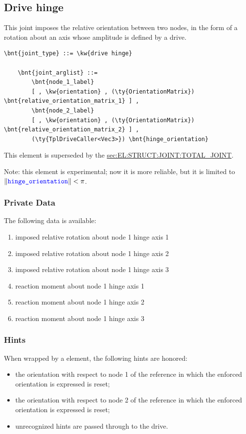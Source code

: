 \subsection{Drive hinge}
\label{sec:EL:JOINT:DRIVEHINGE}
This joint imposes the relative orientation between two nodes,
in the form of a rotation about an axis whose amplitude is defined
by a drive.
\begin{Verbatim}[commandchars=\\\{\}]
    \bnt{joint_type} ::= \kw{drive hinge}

    \bnt{joint_arglist} ::= 
        \bnt{node_1_label}
        [ , \kw{orientation} , (\ty{OrientationMatrix}) \bnt{relative_orientation_matrix_1} ] ,
        \bnt{node_2_label}
        [ , \kw{orientation} , (\ty{OrientationMatrix}) \bnt{relative_orientation_matrix_2} ] ,
        (\ty{TplDriveCaller<Vec3>}) \bnt{hinge_orientation}
\end{Verbatim}
This element is superseded by the
\hyperref{\kw{total joint}}{\kw{total joint}, see Section~}{}{sec:EL:STRUCT:JOINT:TOTAL_JOINT}.

Note: this element is experimental; now it is more reliable, 
but it is limited to $\left\| \textcolor{blue}{\texttt{hinge\_orientation}} \right\| < \pi$.

\subsubsection{Private Data}
The following data is available:
\begin{enumerate}
\item {} imposed relative rotation about node 1 hinge axis 1
\item {} imposed relative rotation about node 1 hinge axis 2
\item {} imposed relative rotation about node 1 hinge axis 3
\item {} reaction moment about node 1 hinge axis 1
\item {} reaction moment about node 1 hinge axis 2
\item {} reaction moment about node 1 hinge axis 3
\end{enumerate}

\subsubsection{Hints}
When wrapped by a  element, the following hints are honored:
\begin{itemize}
\item {} the orientation with respect to node 1
of the reference in which the enforced orientation is expressed is reset;
\item {} the orientation with respect to node 2
of the reference in which the enforced orientation is expressed is reset;
\item unrecognized hints are passed through to the  drive.
\end{itemize}

